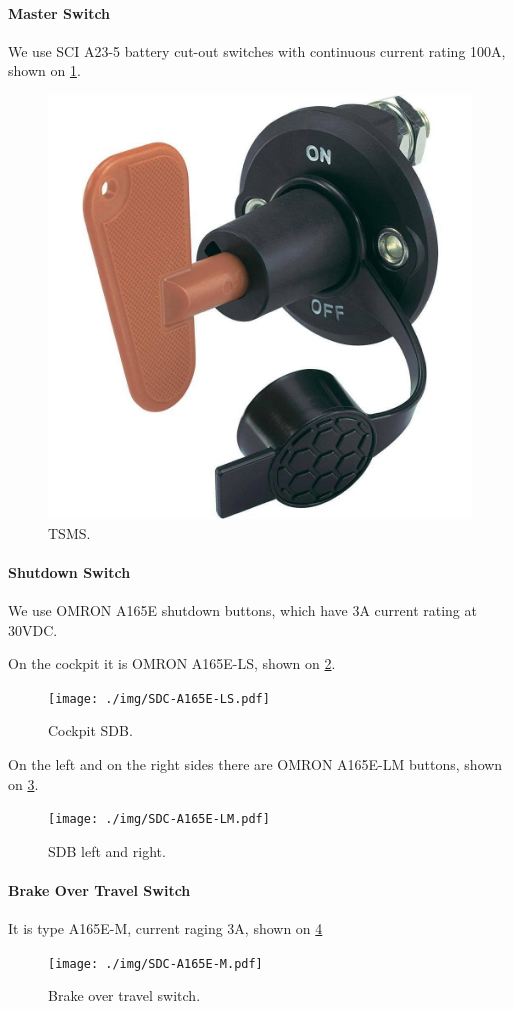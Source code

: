 \paragraph{Master Switch}
We use SCI A23-5 battery cut-out switches with continuous current rating 100A, shown on \ref{fig:SDC-TSMS}.
\begin{figure}[H]
	\centering
	\includegraphics[width=.5\textwidth]{./img/SDC-TSMS.jpg}
	\caption{TSMS.}
	\label{fig:SDC-TSMS}
\end{figure}

\paragraph{Shutdown Switch}
We use OMRON A165E shutdown buttons, which have 3A current rating at 30VDC.

On the cockpit it is OMRON A165E-LS, shown on \ref{fig:SDC-A165E-LS}.
\begin{figure}[H]
	\centering
	\texttt{[image: ./img/SDC-A165E-LS.pdf]}
	\caption{Cockpit SDB.}
	\label{fig:SDC-A165E-LS}
\end{figure}

On the left and on the right sides there are OMRON A165E-LM buttons, shown on \ref{fig:SDC-A165E-LM}.
\begin{figure}[H]
	\centering
	\texttt{[image: ./img/SDC-A165E-LM.pdf]}
	\caption{SDB left and right.}
	\label{fig:SDC-A165E-LM}
\end{figure}

\paragraph{Brake Over Travel Switch}
It is type A165E-M, current raging 3A, shown on \ref{fig:SDC-A165E-M}
\begin{figure}[H]
	\centering
	\texttt{[image: ./img/SDC-A165E-M.pdf]}
	\caption{Brake over travel switch.}
	\label{fig:SDC-A165E-M}
\end{figure}


